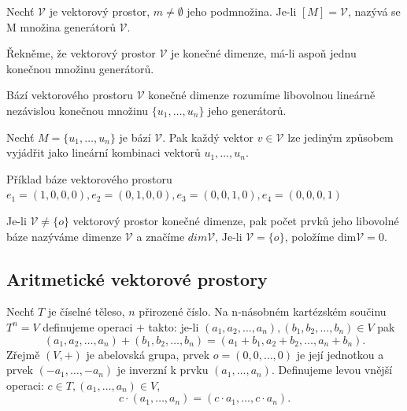 \begin{definition}
	Nechť  $\mathscr{V}$ je vektorový prostor, $m \not= \emptyset$ jeho podmnožina. Je-li $[M] =\mathscr{V}$, nazývá se M množina generátorů  $\mathscr{V}$.
\end{definition}

\begin{definition}
	Řekněme, že vektorový prostor $\mathscr{V}$ je konečné dimenze, má-li aspoň jednu konečnou množinu generátorů.
\end{definition}

\begin{definition}
	Bází vektorového prostoru $\mathscr{V}$ konečné dimenze rozumíme libovolnou lineárně nezávislou konečnou množinu $\{u_1, \dots, u_n\}$ jeho generátorů.
\end{definition}

\begin{sentence}
	Nechť $M = \{u_1, \dots, u_n\}$ je bází $\mathscr{V}$. Pak každý vektor $v \in \mathscr{V}$ lze jediným způsobem vyjádřit jako lineární kombinaci vektorů $u_1, \dots, u_n$.
\end{sentence}

\begin{example}
	Příklad báze vektorového prostoru $e_1 = (1,0,0,0), e_2 = (0,1,0,0), e_3 = (0,0,1,0), e_4 = (0,0,0,1)$
\end{example}

\begin{definition}
	Je-li $\mathscr{V} \not= \{o\}$  vektorový prostor konečné dimenze, pak počet prvků jeho libovolné báze nazýváme dimenze $\mathscr{V}$ a značíme $dim\mathscr{V}$, Je-li $\mathscr{V} = \{o\}$, položíme dim$\mathscr{V} = 0$.
\end{definition}


\subsection{Aritmetické vektorové prostory}
Nechť $T$ je číselné těleso, $n$ přirozené číslo. Na n-násobném kartézském součinu $T^n = V$ definujeme operaci $+$ takto: je-li $(a_1,a_2,\dots, a_n), (b_1,b_2,\dots, b_n) \in V$ pak $$(a_1,a_2,\dots, a_n) +(b_1,b_2,\dots, b_n) = (a_1 + b_1, a_2 + b_2,\dots, a_n + b_n).$$
Zřejmě $(V, +)$ je abelovská grupa, prvek $o = (0,0, \dots, 0)$ je její jednotkou a prvek $(- a_1, \dots, - a_n)$ je inverzní k prvku $(a_1, \dots, a_n)$. Definujeme levou vnější operaci: $c \in T, (a_1, \dots, a_n) \in V$, $$c \cdot (a_1,\dots, a_n) = (c \cdot a_1,\dots,c \cdot a_n).$$

